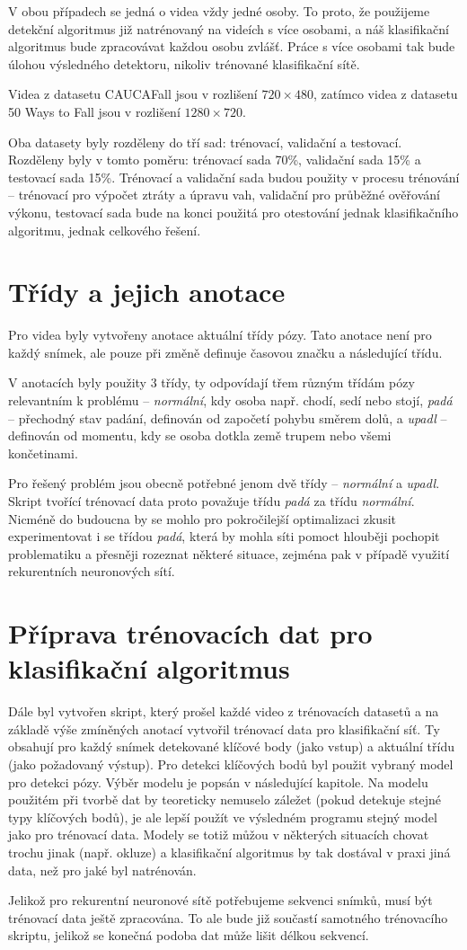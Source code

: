 V obou případech se jedná o videa vždy jedné osoby. To proto, že použijeme
detekční algoritmus již natrénovaný na videích s více osobami, a náš
klasifikační algoritmus bude zpracovávat každou osobu zvlášť. Práce s více
osobami tak bude úlohou výsledného detektoru, nikoliv trénované klasifikační
sítě.

Videa z datasetu CAUCAFall jsou v rozlišení $720\times480$, zatímco videa z
datasetu 50 Ways to Fall jsou v rozlišení $1280\times720$.

Oba datasety byly rozděleny do tří sad: trénovací, validační a testovací.
Rozděleny byly v tomto poměru: trénovací sada 70\%, validační sada 15\% a
testovací sada 15\%. Trénovací a validační sada budou použity v procesu
trénování – trénovací pro výpočet ztráty a úpravu vah, validační pro průběžné
ověřování výkonu, testovací sada bude na konci použitá pro otestování jednak
klasifikačního algoritmu, jednak celkového řešení.

\section{Třídy a jejich anotace}
Pro videa byly vytvořeny anotace aktuální třídy pózy. Tato anotace není pro
každý snímek, ale pouze při změně definuje časovou značku a následující třídu.

V anotacích byly použity 3 třídy, ty odpovídají třem různým třídám pózy
relevantním k problému – \textit{normální}, kdy osoba např. chodí, sedí nebo
stojí, \textit{padá} – přechodný stav padání, definován od započetí pohybu
směrem dolů, a \textit{upadl} – definován od momentu, kdy se osoba dotkla země
trupem nebo všemi končetinami.

Pro řešený problém jsou obecně potřebné jenom dvě třídy – \textit{normální} a
\textit{upadl}. Skript tvořící trénovací data proto považuje třídu
\textit{padá} za třídu \textit{normální}. Nicméně do budoucna by se mohlo pro
pokročilejší optimalizaci zkusit experimentovat i se třídou \textit{padá},
která by mohla síti pomoct hlouběji pochopit problematiku a přesněji rozeznat
některé situace, zejména pak v případě využití rekurentních neuronových sítí.

\section{Příprava trénovacích dat pro klasifikační algoritmus}

Dále byl vytvořen skript, který prošel každé video z trénovacích datasetů a na
základě výše zmíněných anotací vytvořil trénovací data pro klasifikační
síť. Ty obsahují pro každý snímek detekované klíčové body (jako vstup) a
aktuální třídu (jako požadovaný výstup). Pro detekci klíčových bodů byl použit
vybraný model pro detekci pózy. Výběr modelu je popsán v následující kapitole.
Na modelu použitém při tvorbě dat by teoreticky nemuselo záležet (pokud detekuje stejné typy
klíčových bodů), je ale lepší použít ve výsledném programu stejný model jako
pro trénovací data. Modely se totiž můžou v některých situacích chovat trochu
jinak (např. okluze) a klasifikační algoritmus by tak dostával v praxi jiná data, než pro
jaké byl natrénován.

Jelikož pro rekurentní neuronové sítě potřebujeme sekvenci snímků, musí být
trénovací data ještě zpracována. To ale bude již součastí samotného trénovacího
skriptu, jelikož se konečná podoba dat může lišit délkou sekvencí.
\endinput
